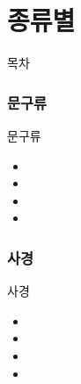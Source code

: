 \documentclass[aspectratio=1610,17pt,xcolor=pdftex,dvipsnames,table,handout]{beamer}
\begin{document}
		\part{ 종류별 }
		\frame{\partpage}


		\begin{frame} [plain]{목차}
		\tableofcontents
		\end{frame}


		\section{문구류}
		\frame [plain] {\sectionpage}

		\begin{frame} [t,plain]
			\begin{block} { 문구류 }
			\begin{itemize}
				\item 
				\item 
				\item 
				\item 
			\end{itemize}
			
			\end{block}
		\end{frame}


		\section{ 사경 }
		\frame [plain] {\sectionpage}

		\begin{frame} [t,plain]
			\begin{block} { 사경 }
			\begin{itemize}
				\item 
				\item 
				\item 
				\item 
			\end{itemize}
			
			\end{block}
		\end{frame}
	
\end{document}
